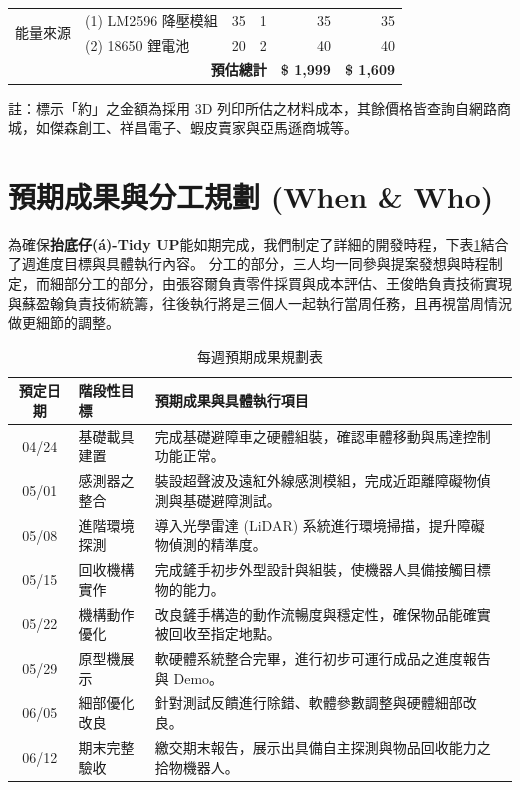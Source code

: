 \documentclass[12pt]{article}
\begin{document}
\begin{table}[H]
\begin{tabularx}{\linewidth}{l X r c r r}
    \multirow{2}{*}{能量來源} 
      & (1) LM2596 降壓模組             & 35 & 1 & 35 & 35\\
      & (2) 18650 鋰電池                & 20 & 2 & 40 & 40\\
    \midrule
    \multicolumn{4}{r}{\textbf{預估總計}} & \textbf{\$ 1{,}999} & \textbf{\$ 1{,}609}\\
    \bottomrule
  \end{tabularx}
  \par\vspace{4pt}
  \begin{flushleft}
    \footnotesize 註：標示「約」之金額為採用 3D 列印所估之材料成本，其餘價格皆查詢自網路商城，如傑森創工、祥昌電子、蝦皮賣家與亞馬遜商城等。
  \end{flushleft}
\end{table}

\section{預期成果與分工規劃 (When \& Who)}

為確保\textbf{抬底仔(á)-Tidy UP}能如期完成，我們制定了詳細的開發時程，下表\ref{tab:schedule_v2}結合了週進度目標與具體執行內容。
分工的部分，三人均一同參與提案發想與時程制定，而細部分工的部分，由張容爾負責零件採買與成本評估、王俊皓負責技術實現與蘇盈翰負責技術統籌，往後執行將是三個人一起執行當周任務，且再視當周情況做更細節的調整。

\begin{table}[H]
    \centering
    \caption{每週預期成果規劃表}
    \label{tab:schedule_v2}
    \renewcommand{\arraystretch}{1.4} %
    \begin{tabularx}{\textwidth}{c |l| X c} %
        \toprule
        \textbf{預定日期} & \textbf{階段性目標} & \textbf{預期成果與具體執行項目}  \\
        \midrule
        04/24 & 基礎載具建置 & 完成基礎避障車之硬體組裝，確認車體移動與馬達控制功能正常。  \\
        05/01 & 感測器之整合 & 裝設超聲波及遠紅外線感測模組，完成近距離障礙物偵測與基礎避障測試。 \\
        05/08 & 進階環境探測 & 導入光學雷達 (LiDAR) 系統進行環境掃描，提升障礙物偵測的精準度。  \\
        05/15 & 回收機構實作 & 完成鏟手初步外型設計與組裝，使機器人具備接觸目標物的能力。 \\
        05/22 & 機構動作優化 & 改良鏟手構造的動作流暢度與穩定性，確保物品能確實被回收至指定地點。  \\
        05/29 & 原型機展示 & 軟硬體系統整合完畢，進行初步可運行成品之進度報告與 Demo。  \\
        06/05 & 細部優化改良 & 針對測試反饋進行除錯、軟體參數調整與硬體細部改良。\\
        06/12 & 期末完整驗收 & 繳交期末報告，展示出具備自主探測與物品回收能力之拾物機器人。\\
        \bottomrule
    \end{tabularx}
\end{table}
\end{document}
